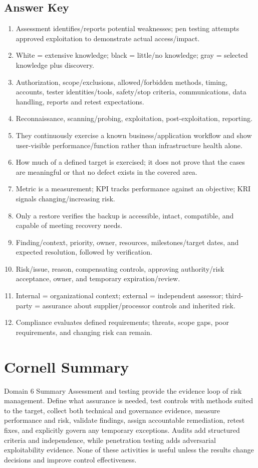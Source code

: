 \documentclass[10pt,letterpaper]{article}
\begin{document}
\subsection*{Answer Key}
\begin{enumerate}
\item Assessment identifies/reports potential weaknesses; pen testing attempts approved exploitation to demonstrate actual access/impact.
\item White = extensive knowledge; black = little/no knowledge; gray = selected knowledge plus discovery.
\item Authorization, scope/exclusions, allowed/forbidden methods, timing, accounts, tester identities/tools, safety/stop criteria, communications, data handling, reports and retest expectations.
\item Reconnaissance, scanning/probing, exploitation, post-exploitation, reporting.
\item They continuously exercise a known business/application workflow and show user-visible performance/function rather than infrastructure health alone.
\item How much of a defined target is exercised; it does not prove that the cases are meaningful or that no defect exists in the covered area.
\item Metric is a measurement; KPI tracks performance against an objective; KRI signals changing/increasing risk.
\item Only a restore verifies the backup is accessible, intact, compatible, and capable of meeting recovery needs.
\item Finding/context, priority, owner, resources, milestones/target dates, and expected resolution, followed by verification.
\item Risk/issue, reason, compensating controls, approving authority/risk acceptance, owner, and temporary expiration/review.
\item Internal = organizational context; external = independent assessor; third-party = assurance about supplier/processor controls and inherited risk.
\item Compliance evaluates defined requirements; threats, scope gaps, poor requirements, and changing risk can remain.
\end{enumerate}

\section{Cornell Summary}
\begin{summarybox}{Domain 6 Summary}
Assessment and testing provide the evidence loop of risk management. Define what assurance is needed, test controls with methods suited to the target, collect both technical and governance evidence, measure performance and risk, validate findings, assign accountable remediation, retest fixes, and explicitly govern any temporary exceptions. Audits add structured criteria and independence, while penetration testing adds adversarial exploitability evidence. None of these activities is useful unless the results change decisions and improve control effectiveness.
\end{summarybox}
\end{document}
